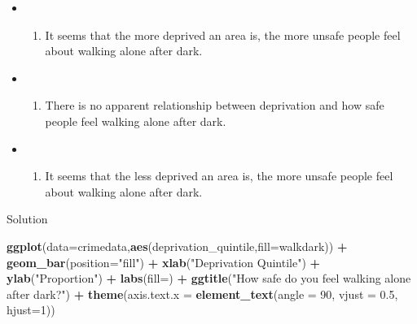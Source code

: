 \documentclass[
]{book}
\newenvironment{Shaded}{\begin{snugshade}}{\end{snugshade}}
\newcommand{\AttributeTok}[1]{\textcolor[rgb]{0.13,0.29,0.53}{#1}}
\newcommand{\DecValTok}[1]{\textcolor[rgb]{0.00,0.00,0.81}{#1}}
\newcommand{\FloatTok}[1]{\textcolor[rgb]{0.00,0.00,0.81}{#1}}
\newcommand{\FunctionTok}[1]{\textcolor[rgb]{0.13,0.29,0.53}{\textbf{#1}}}
\newcommand{\NormalTok}[1]{#1}
\newcommand{\SpecialCharTok}[1]{\textcolor[rgb]{0.81,0.36,0.00}{\textbf{#1}}}
\newcommand{\StringTok}[1]{\textcolor[rgb]{0.31,0.60,0.02}{#1}}
\providecommand{\tightlist}{%
  \setlength{\itemsep}{0pt}\setlength{\parskip}{0pt}}
\begin{document}
\begin{itemize}
\item
  \begin{enumerate}
  \def\labelenumi{(\Alph{enumi})}
  \tightlist
  \item
    It seems that the more deprived an area is, the more unsafe people feel about walking alone after dark.\\
  \end{enumerate}
\item
  \begin{enumerate}
  \def\labelenumi{(\Alph{enumi})}
  \setcounter{enumi}{1}
  \tightlist
  \item
    There is no apparent relationship between deprivation and how safe people feel walking alone after dark.\\
  \end{enumerate}
\item
  \begin{enumerate}
  \def\labelenumi{(\Alph{enumi})}
  \setcounter{enumi}{2}
  \tightlist
  \item
    It seems that the less deprived an area is, the more unsafe people feel about walking alone after dark.
  \end{enumerate}
\end{itemize}

Solution

\begin{Shaded}
\begin{Highlighting}[]
\FunctionTok{ggplot}\NormalTok{(}\AttributeTok{data=}\NormalTok{crimedata,}\FunctionTok{aes}\NormalTok{(deprivation\_quintile,}\AttributeTok{fill=}\NormalTok{walkdark)) }\SpecialCharTok{+} \FunctionTok{geom\_bar}\NormalTok{(}\AttributeTok{position=}\StringTok{"fill"}\NormalTok{) }\SpecialCharTok{+}
  \FunctionTok{xlab}\NormalTok{(}\StringTok{"Deprivation Quintile"}\NormalTok{) }\SpecialCharTok{+} \FunctionTok{ylab}\NormalTok{(}\StringTok{"Proportion"}\NormalTok{) }\SpecialCharTok{+}
  \FunctionTok{labs}\NormalTok{(}\AttributeTok{fill=}\StringTok{\textquotesingle{}\textquotesingle{}}\NormalTok{) }\SpecialCharTok{+} \FunctionTok{ggtitle}\NormalTok{(}\StringTok{"How safe do you feel walking alone after dark?"}\NormalTok{) }\SpecialCharTok{+} \FunctionTok{theme}\NormalTok{(}\AttributeTok{axis.text.x =} \FunctionTok{element\_text}\NormalTok{(}\AttributeTok{angle =} \DecValTok{90}\NormalTok{, }\AttributeTok{vjust =} \FloatTok{0.5}\NormalTok{, }\AttributeTok{hjust=}\DecValTok{1}\NormalTok{))}
\end{Highlighting}
\end{Shaded}
\end{document}
